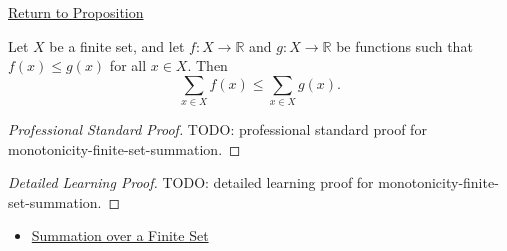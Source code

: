 \newpage
{}
\label{prf:monotonicity-finite-set-summation}

\begin{remark*}[Return]
\hyperref[prop:monotonicity-finite-set-summation]{Return to Proposition}
\end{remark*}

\begin{proposition*}
Let \(X\) be a finite set, and let \(f:X\to\mathbb{R}\) and
\(g:X\to\mathbb{R}\) be functions such that \(f(x)\le g(x)\) for all
\(x\in X\). Then
\[
  \sum_{x\in X} f(x)
  \le
  \sum_{x\in X} g(x).
\]
\end{proposition*}

\begin{proof}[Professional Standard Proof]
\LRAProofBodyStart
TODO: professional standard proof for monotonicity-finite-set-summation.
\end{proof}

\begin{proof}[Detailed Learning Proof]
\LRAProofBodyStart
TODO: detailed learning proof for monotonicity-finite-set-summation.
\end{proof}

\begin{remark*}
\end{remark*}

\begin{dependencies}
\begin{itemize}
  \item \hyperref[def:summation-over-finite-set]{Summation over a Finite Set}
\end{itemize}
\end{dependencies}

\clearpage
